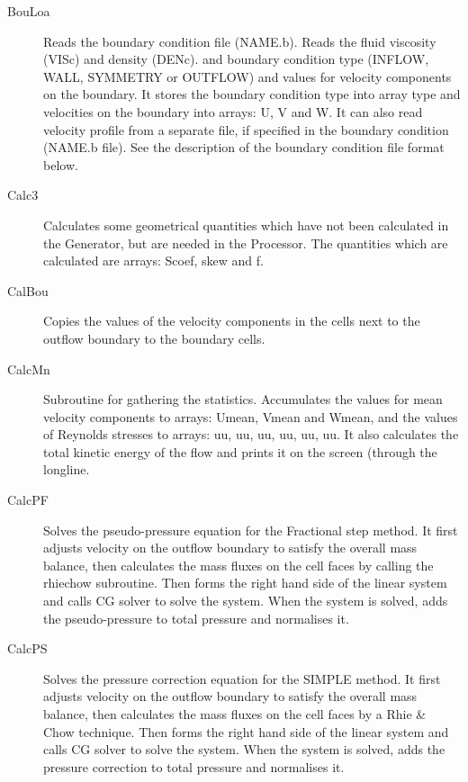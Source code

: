 \documentclass[10pt]{article}
\newcommand*{\tc}{\ttfamily} %
\newcommand*{\tn}{\sffamily} %
\begin{document}
    \begin{description}

    \item[\tc BouLoa] Reads the boundary condition file ({\tc NAME.b}).
      Reads the fluid viscosity ({\tc VISc}) and density ({\tc DENc}).
      and boundary condition type ({\tc INFLOW}, {\tc WALL}, {\tc SYMMETRY}
      or {\tc OUTFLOW}) and
      values for velocity components on the boundary. It stores the
      boundary condition type into array {\tc type} and velocities on
      the boundary into arrays: {\tc U}, {\tc V} and {\tc W}. It can
      also read velocity profile from a separate file, if specified
      in the boundary condition ({\tc NAME.b file}). See the description
      of the boundary condition file format below.

    \item[\tc Calc3] Calculates some geometrical quantities which have
      not been calculated in the {\tn Generator}, but are needed in the
      {\tn Processor}. The quantities which are calculated are arrays:
      {\tc Scoef}, {\tc skew} and {\tc f}.

    \item[\tc CalBou] Copies the values of the velocity components
      in the cells next to the outflow boundary to the boundary cells.

    \item[\tc CalcMn] Subroutine for gathering the statistics.
      Accumulates the values for mean velocity components to arrays:
      {\tc Umean}, {\tc Vmean} and {\tc Wmean}, and the values of
      Reynolds stresses to arrays: {\tc uu}, {\tc uu}, {\tc uu}, 
      {\tc uu}, {\tc uu}, {\tc uu}. It also calculates the total
      kinetic energy of the flow and prints it on the screen 
      (through the {\tc longline}.  

    \item[\tc CalcPF] Solves the pseudo-pressure equation for the
      Fractional step method. It first adjusts velocity on the 
      outflow boundary to satisfy the overall mass balance, then
      calculates the mass fluxes on the cell faces by calling the
      {\tc rhiechow} subroutine. Then forms the right hand side
      of the linear system and calls CG solver to solve the system.
      When the system is solved, adds the pseudo-pressure to total
      pressure and normalises it.

    \item[\tc CalcPS] Solves the pressure correction equation for 
      the SIMPLE method. It first adjusts velocity on the 
      outflow boundary to satisfy the overall mass balance, then
      calculates the mass fluxes on the cell faces by a Rhie \& Chow 
      technique. Then forms the right hand side
      of the linear system and calls CG solver to solve the system.
      When the system is solved, adds the pressure  correction to total
      pressure and normalises it.


\end{description}
\end{document}
